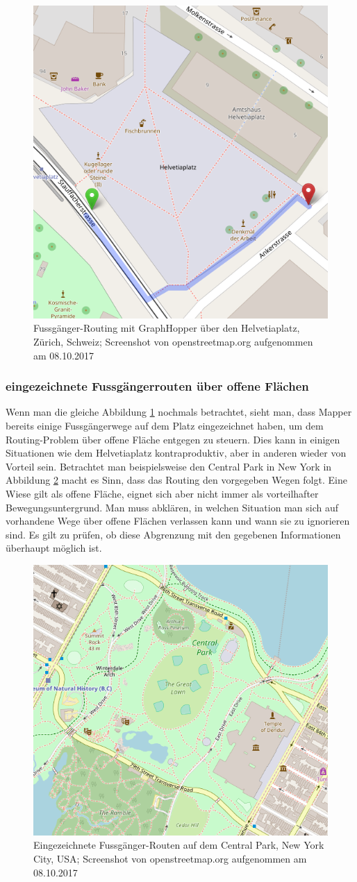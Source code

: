 \begin{figure}[ht]
	\centering
	\includegraphics[width=0.5\linewidth]{technicalreport/img/helvetiaplatz_graphhopper}
	\caption[Fussgänger-Routing]{Fussgänger-Routing mit GraphHopper über den Helvetiaplatz, Zürich, Schweiz; Screenshot von openstreetmap.org aufgenommen am 08.10.2017}
	\label{fig:helvetiaplatz_graphhopper}
\end{figure}

\subsubsection{eingezeichnete Fussgängerrouten über offene Flächen}
\label{problem:eingezeichnete Fussgängerrouten über offene Flächen}
Wenn man die gleiche Abbildung \ref{fig:helvetiaplatz_graphhopper} nochmals betrachtet, sieht man, dass Mapper bereits einige Fussgängerwege auf dem Platz eingezeichnet haben, um dem Routing-Problem über offene Fläche entgegen zu steuern. Dies kann in einigen Situationen wie dem Helvetiaplatz kontraproduktiv, aber in anderen wieder von Vorteil sein. Betrachtet man beispielsweise den Central Park in New York in Abbildung \ref{fig:central_park} macht es Sinn, dass das Routing den vorgegeben Wegen folgt. Eine Wiese gilt als offene Fläche, eignet sich aber nicht immer als vorteilhafter Bewegungsuntergrund. Man muss abklären, in welchen Situation man sich auf vorhandene Wege über offene Flächen verlassen kann und wann sie zu ignorieren sind. Es gilt zu prüfen, ob diese Abgrenzung mit den gegebenen Informationen überhaupt möglich ist.

\begin{figure}[ht]
\centering
\includegraphics[width=0.5\linewidth]{technicalreport/img/central_park}
\caption[eingezeichnete Fussgänger-Routen]{Eingezeichnete Fussgänger-Routen auf dem Central Park, New York City, USA; Screenshot von openstreetmap.org aufgenommen am 08.10.2017}
\label{fig:central_park}
\end{figure}

